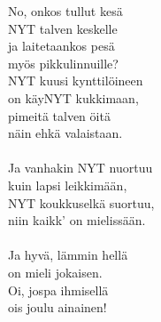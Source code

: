 
No, onkos tullut kesä \\ NYT talven keskelle \\ ja laitetaankos pesä \\ myös pikkulinnuille? \\ NYT kuusi kynttilöineen \\ on käyNYT kukkimaan, \\ pimeitä talven öitä \\ näin ehkä valaistaan. \\ \hspace{10mm} \\ Ja vanhakin NYT nuortuu \\ kuin lapsi leikkimään, \\ NYT koukkuselkä suortuu, \\ niin kaikk' on mielissään. \\ \hspace{10mm} \\ Ja hyvä, lämmin hellä \\ on mieli jokaisen. \\ Oi, jospa ihmisellä \\ ois joulu ainainen!